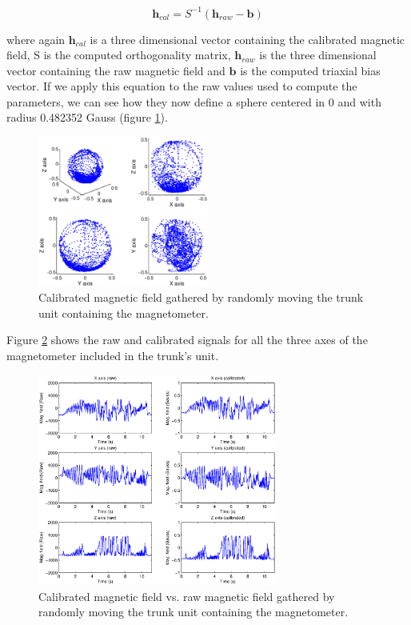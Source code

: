 \begin{equation}
\label{eq:cal_mag}
\mathbf{h}_{cal}=S^{-1}(\mathbf{h}_{raw}-\mathbf{b})
\end{equation}

where again $\mathbf{h}_{cal}$ is a three dimensional vector containing the calibrated magnetic field, S is the computed orthogonality matrix, $\mathbf{h}_{raw}$ is the three dimensional vector containing the raw magnetic field and $\mathbf{b}$ is the computed triaxial bias vector. If we apply this equation to the raw values used to compute the parameters, we can see how they now define a sphere centered in 0 and with radius 0.482352 Gauss (figure \ref{fig:mag_cal_3D}).

\begin{figure}[H]
\centering
\includegraphics[width=0.5\textwidth]{figures/trunk_calMag3D_4POV.eps}
\caption{Calibrated magnetic field gathered by randomly moving the trunk unit containing the magnetometer.}
\label{fig:mag_cal_3D}
\end{figure}

Figure \ref{fig:trunk_rawVsCal} shows the raw and calibrated signals for all the three axes of the magnetometer included in the trunk's unit.

\begin{figure}[H]
\centering
\includegraphics[width=0.7\textwidth]{figures/trunk_rawVsCal.eps}
\caption{Calibrated magnetic field vs. raw magnetic field gathered by randomly moving the trunk unit containing the magnetometer.}
\label{fig:trunk_rawVsCal}
\end{figure}

